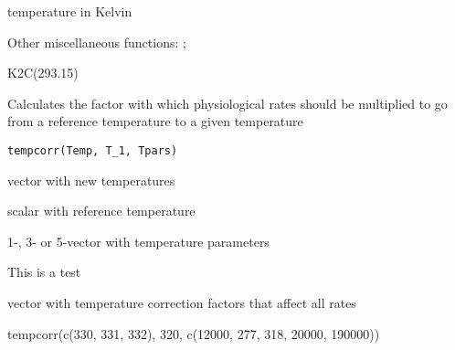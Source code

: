 \documentclass[a4paper]{book}
\begin{document}
%
\begin{Value}
temperature in Kelvin
\end{Value}
%
\begin{SeeAlso}\relax
Other miscellaneous functions: ;
\end{SeeAlso}
%
\begin{Examples}
\begin{ExampleCode}
K2C(293.15)
\end{ExampleCode}
\end{Examples}
%
\begin{Description}\relax
Calculates the factor with which physiological rates should be multiplied to go from a reference temperature to a given temperature
\end{Description}
%
\begin{Usage}
\begin{verbatim}
tempcorr(Temp, T_1, Tpars)
\end{verbatim}
\end{Usage}
%
\begin{Arguments}
\begin{ldescription}
\item[\code{Temp}] vector with new temperatures

\item[\code{T\_1}] scalar with reference temperature

\item[\code{Tpars}] 1-, 3- or 5-vector with temperature parameters
\end{ldescription}
\end{Arguments}
%
\begin{Details}\relax
This is a test \eqn{\theta}{}
\end{Details}
%
\begin{Value}
vector with temperature correction factors that affect all rates
\end{Value}
%
\begin{Examples}
\begin{ExampleCode}
tempcorr(c(330, 331, 332), 320, c(12000, 277, 318, 20000, 190000))
\end{ExampleCode}
\end{Examples}
\printindex{}
\end{document}

